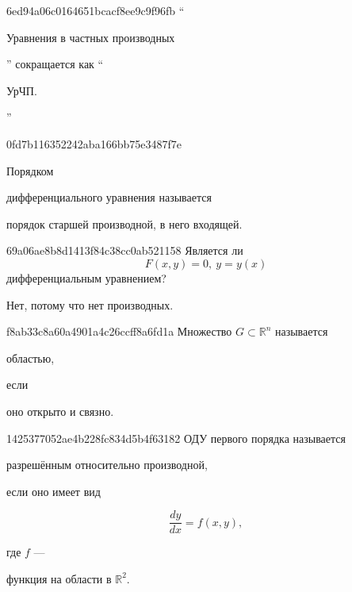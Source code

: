 \begin{note}{6ed94a06c0164651bcacf8ee9c9f96fb}
    ``\begin{icloze}{2}Уравнения в частных производных\end{icloze}'' сокращается как ``\begin{icloze}{1}УрЧП.\end{icloze}''
\end{note}

\begin{note}{0fd7b116352242aba166bb75e3487f7e}
    \begin{icloze}{2}Порядком\end{icloze} дифференциального уравнения называется \begin{icloze}{1}порядок старшей производной, в него входящей.\end{icloze}
\end{note}

\begin{note}{69a06ae8b8d1413f84c38cc0ab521158}
    Является ли
    \[
        F(x, y) = 0,\: y = y(x)
    \]
    дифференциальным уравнением?

    \begin{cloze}{1}
        Нет, потому что нет производных.
    \end{cloze}
\end{note}

\begin{note}{f8ab33c8a60a4901a4c26ccff8a6fd1a}
    Множество \({ G \subset \mathbb R^n }\) называется \begin{icloze}{2}областью,\end{icloze} если \begin{icloze}{1}оно открыто и связно.\end{icloze}
\end{note}

\begin{note}{1425377052ae4b228fc834d5b4f63182}
    ОДУ первого порядка называется \begin{icloze}{2}разрешённым относительно производной,\end{icloze} если оно имеет вид
    \begin{icloze}{1}
        \[
            \frac{dy}{dx} = f(x, y),
        \]
    \end{icloze}
    где \({ f }\) --- \begin{icloze}{2}функция на области в \({ \mathbb R^2 }\).\end{icloze}
\end{note}

